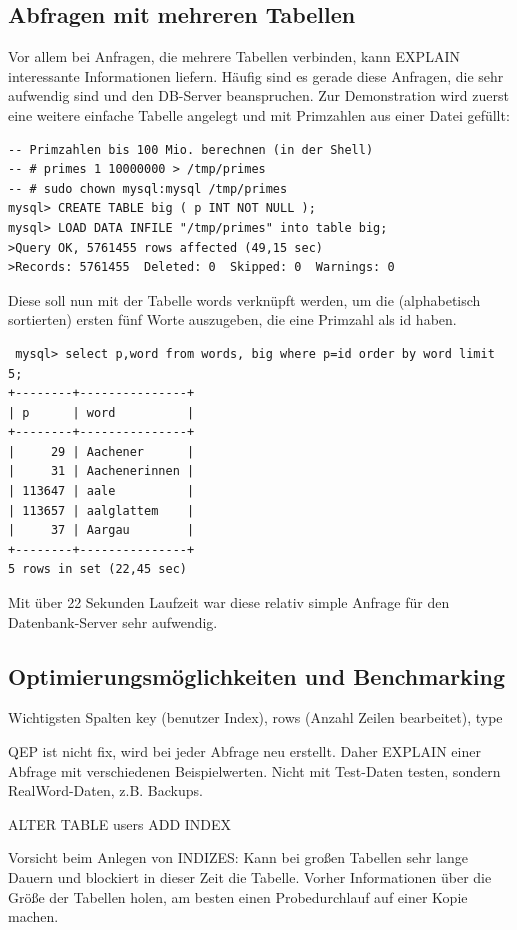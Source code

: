 \subsection{Abfragen mit mehreren Tabellen}
Vor allem bei Anfragen, die mehrere Tabellen verbinden, kann EXPLAIN interessante Informationen liefern. Häufig sind es gerade diese Anfragen, die sehr aufwendig sind und den DB-Server beanspruchen.
Zur Demonstration wird zuerst eine weitere einfache Tabelle angelegt und mit Primzahlen aus einer Datei gefüllt:
\begin{lstlisting}
-- Primzahlen bis 100 Mio. berechnen (in der Shell)
-- # primes 1 10000000 > /tmp/primes
-- # sudo chown mysql:mysql /tmp/primes
mysql> CREATE TABLE big ( p INT NOT NULL );
mysql> LOAD DATA INFILE "/tmp/primes" into table big;
>Query OK, 5761455 rows affected (49,15 sec)
>Records: 5761455  Deleted: 0  Skipped: 0  Warnings: 0
\end{lstlisting}
Diese soll nun mit der Tabelle words verknüpft werden, um die (alphabetisch sortierten) ersten fünf Worte auszugeben, die eine Primzahl als id haben.
\begin{lstlisting}
 mysql> select p,word from words, big where p=id order by word limit 5;
+--------+---------------+
| p      | word          |
+--------+---------------+
|     29 | Aachener      |
|     31 | Aachenerinnen |
| 113647 | aale          |
| 113657 | aalglattem    |
|     37 | Aargau        |
+--------+---------------+
5 rows in set (22,45 sec)
\end{lstlisting}
Mit über 22 Sekunden Laufzeit war diese relativ simple Anfrage für den Datenbank-Server sehr aufwendig.

\subsection{Optimierungsmöglichkeiten und Benchmarking}
Wichtigsten Spalten key (benutzer Index), rows (Anzahl Zeilen bearbeitet), type

QEP ist nicht fix, wird bei jeder Abfrage neu erstellt. Daher EXPLAIN einer Abfrage mit verschiedenen Beispielwerten.
Nicht mit Test-Daten testen, sondern RealWord-Daten, z.B. Backups.

ALTER TABLE users ADD INDEX

Vorsicht beim Anlegen von INDIZES: Kann bei großen Tabellen sehr lange Dauern und blockiert in dieser Zeit die Tabelle.
Vorher Informationen über die Größe der Tabellen holen, am besten einen Probedurchlauf auf einer Kopie machen.

